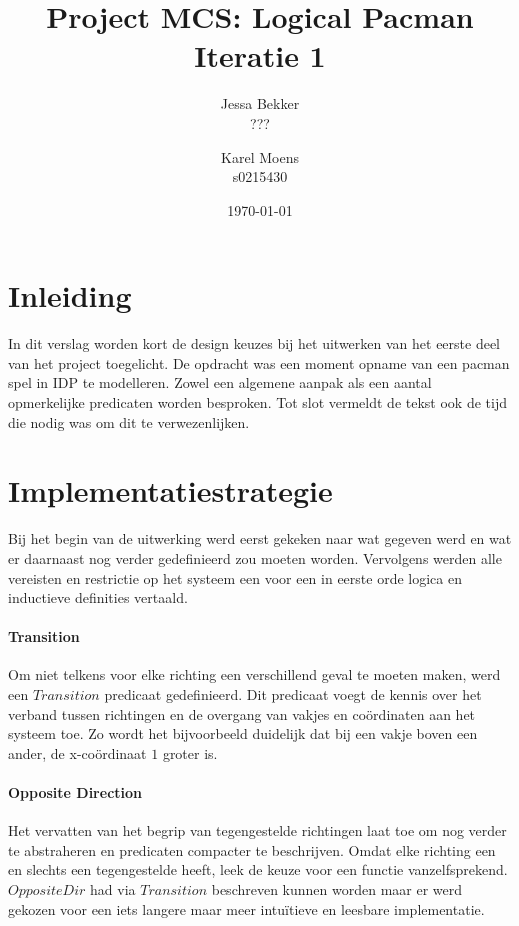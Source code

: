\documentclass[a4paper,12pt]{article}
\title{Project MCS: Logical Pacman \\ Iteratie 1}
\author{Jessa Bekker\\??? \and Karel Moens \\ s0215430 }
\date{\today}
\begin{document}
\maketitle


\section{Inleiding}
In dit verslag worden kort de design keuzes bij het uitwerken van het eerste deel van het project toegelicht.
De opdracht was een moment opname van een pacman spel in IDP te modelleren. 
Zowel een algemene aanpak als een aantal opmerkelijke predicaten worden besproken.
Tot slot vermeldt de tekst ook de tijd die nodig was om dit te verwezenlijken.

\section{Implementatiestrategie}
Bij het begin van de uitwerking werd eerst gekeken naar wat gegeven werd en wat er daarnaast nog verder gedefinieerd zou moeten worden.
Vervolgens werden alle vereisten en restrictie op het systeem een voor een in eerste orde logica en inductieve definities vertaald.

\paragraph{Transition}
Om niet telkens voor elke richting een verschillend geval te moeten maken, werd een $Transition$ predicaat gedefinieerd.
Dit predicaat voegt de kennis over het verband tussen richtingen en de overgang van vakjes en co\"ordinaten aan het systeem toe.
Zo wordt het bijvoorbeeld duidelijk dat bij een vakje boven een ander, de x-co\"ordinaat $1$ groter is.


\paragraph{Opposite Direction}
Het vervatten van het begrip van tegengestelde \newline richtingen laat toe om nog verder te abstraheren en predicaten compacter te beschrijven. Omdat elke richting een en slechts een tegengestelde heeft, leek de keuze voor een functie vanzelfsprekend. $OppositeDir$ had via $Transition$ beschreven kunnen worden maar er werd gekozen voor een iets langere maar meer intu\"itieve en leesbare implementatie.
\end{document}
